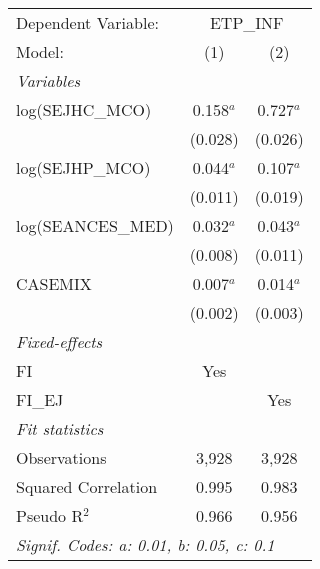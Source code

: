 
\begingroup
\centering
\begin{tabular}{lcc}
   \tabularnewline \midrule \midrule
   Dependent Variable: & \multicolumn{2}{c}{ETP\_INF}\\
   Model:              & (1)         & (2)\\  
   \midrule
   \emph{Variables}\\
   log(SEJHC\_MCO)     & 0.158$^{a}$ & 0.727$^{a}$\\   
                       & (0.028)     & (0.026)\\   
   log(SEJHP\_MCO)     & 0.044$^{a}$ & 0.107$^{a}$\\   
                       & (0.011)     & (0.019)\\   
   log(SEANCES\_MED)   & 0.032$^{a}$ & 0.043$^{a}$\\   
                       & (0.008)     & (0.011)\\   
   CASEMIX             & 0.007$^{a}$ & 0.014$^{a}$\\   
                       & (0.002)     & (0.003)\\   
   \midrule
   \emph{Fixed-effects}\\
   FI                  & Yes         & \\  
   FI\_EJ              &             & Yes\\  
   \midrule
   \emph{Fit statistics}\\
   Observations        & 3,928       & 3,928\\  
   Squared Correlation & 0.995       & 0.983\\  
   Pseudo R$^2$        & 0.966       & 0.956\\  
   \midrule \midrule
   \multicolumn{3}{l}{\emph{Signif. Codes: a: 0.01, b: 0.05, c: 0.1}}\\
\end{tabular}
\par\endgroup


